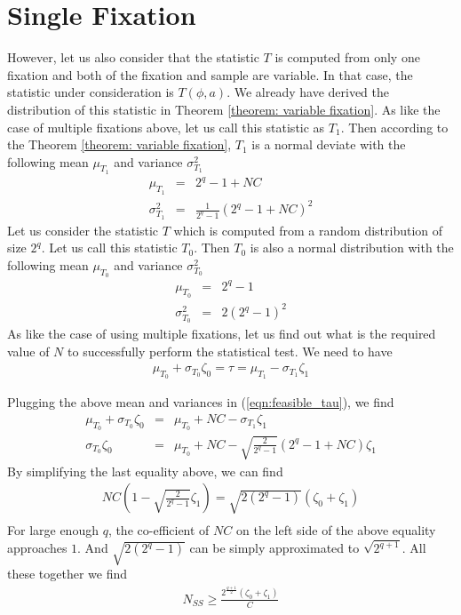 \section{Single Fixation} However, let us also consider that the statistic $T$ is computed from only one fixation and both of the fixation and sample are variable. In that case, the statistic under consideration is $T\left(\phi,a\right)$. We already have derived the distribution of this statistic in 
Theorem \ref{theorem: variable fixation}. As like the case of multiple fixations above, let us call this statistic as $T_1$. Then according to the Theorem \ref{theorem: variable fixation}, $T_1$ is a normal deviate with the following mean $\mu_{T_{1}}$ and variance $\sigma^2_{T_{1}}$
\begin{eqnarray}
\mu_{T_{1}} &=& 2^q - 1 + NC\\
\sigma^2_{T_{1}} &=& \frac{1}{2^q-1}\left(2^q-1 + NC \right)^2
\end{eqnarray}
Let us consider the statistic $T$ which is computed from a random distribution of size $2^q$. Let us call this statistic $T_0$. Then $T_0$ is also a normal distribution with the following mean $\mu_{T_0}$ and variance $\sigma^2_{T_{0}}$
\begin{eqnarray}
\mu_{T_{0}} &=& 2^q - 1\\
\sigma^2_{T_{0}} &=& 2\left(2^q-1\right)^2
\end{eqnarray} As like the case of using multiple fixations, let us find out what is the required value of $N$ to successfully perform the statistical test. We need to have
\begin{eqnarray}
\mu_{T_0}+\sigma_{T_0}\zeta_0 = \tau = \mu_{T_1} - \sigma_{T_1}\zeta_1 
\end{eqnarray} \par \noindent Plugging the above mean and variances in (\ref{eqn:feasible_tau}), we find
\begin{eqnarray*}
\mu_{T_0} + \sigma_{T_{0}}\zeta_0 &=& \mu_{T_{0}} + NC - \sigma_{T_{1}}\zeta_1\\
\sigma_{T_0}\zeta_0 &=& \mu_{T_0} + NC - \sqrt{\frac{2}{2^q - 1}}\left(2^q - 1 + NC \right)\zeta_1
\end{eqnarray*}
By simplifying the last equality above, we can find
\begin{eqnarray*}
NC\left( 1 - \sqrt{\frac{2}{2^q-1}}\zeta_1 \right) = \sqrt{2\left(2^q-1\right)}\left(\zeta_0 + \zeta_1 \right) \\
\end{eqnarray*} For large enough $q$, the co-efficient of $NC$ on the left side of the above equality approaches $1$. And $\sqrt{2\left(2^q - 1 \right)}$ can be simply approximated to $\sqrt{2^{q+1}}$. All these together we find
\begin{eqnarray}
N_{SS} \geq \frac{2^{\frac{q+1}{2}}\left(\zeta_0 + \zeta_1\right)}{C} \label{eqn:data_complexity_single_fixation}
\end{eqnarray}
\fi